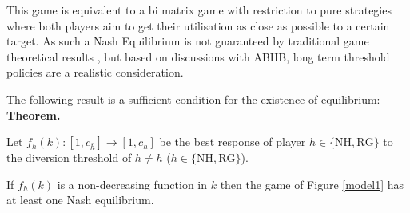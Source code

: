 \documentclass{article}
\newcommand{\NH}{\text{NH}}
\newcommand{\RG}{\text{RG}}
\begin{document}
This game is equivalent to a bi matrix game with restriction to pure strategies where both players aim to get their utilisation as close as possible to a certain target.
As such a Nash Equilibrium is not guaranteed by traditional game theoretical results \cite{Nash1950}, but based on discussions with ABHB, long term threshold policies are a realistic consideration.

The following result is a sufficient condition for the existence of equilibrium:\\


\textbf{Theorem.}

Let $f_{h}(k):[1,c_{\bar h}]\to[1,c_h]$ be the best response of player $h\in\{\NH, \RG\}$ to the diversion threshold of $\bar h\ne h$ ($\bar h\in\{\NH, \RG\}$).

If $f_{h}(k)$ is a non-decreasing function in $k$ then the game of Figure \ref{model1} has at least one Nash equilibrium.
\end{document}
